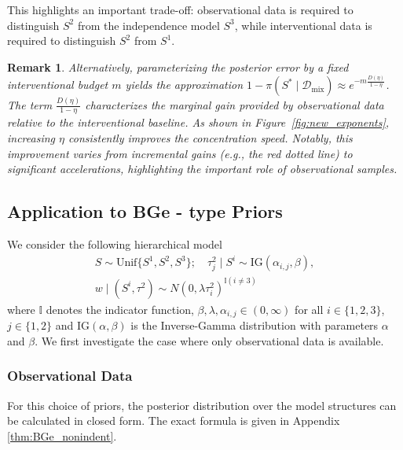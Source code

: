 \documentclass[accepted]{uai2026} %
\newcommand{\train}{\mathcal{D}}
\newcommand{\mixdata}{\train_{\text{mix}}}
\theoremstyle{boldremark}
\newtheorem{remark}{Remark}
\begin{document}
This highlights an important trade-off: observational data is required to distinguish $S^2$ from the independence model $S^3$, while interventional data is required to distinguish $S^2$ from $S^1$. %
\begin{remark}
    Alternatively, parameterizing the posterior error by a fixed interventional budget $m$ yields the approximation $1 - \pi(S^* \mid \mixdata) \approx e^{-m \frac{D(\eta)}{1-\eta}}$. The term $\frac{D(\eta)}{1-\eta}$ characterizes the marginal gain provided by observational data relative to the interventional baseline. As shown in Figure~\ref{fig:new_exponents}, increasing $\eta$ consistently improves the concentration speed. Notably, this improvement varies from incremental gains (e.g., the red dotted line) to significant accelerations, highlighting the important role of observational samples.
\end{remark}


\subsection{Application to BGe - type  Priors}
\label{subsec:bge_models}
We consider the following hierarchical model
\begin{equation}
\label{eq:BGe_priors_compact}
\begin{split}
    S \sim \text{Unif}\{S^1, S^2, S^3\}; \quad \tau_j^2 \mid S^i \sim \text{IG}(\alpha_{i,j}, \beta), \\
    w \mid (S^i, \tau^2) \sim N(0, \lambda\tau_i^2)^{\mathbb{I}(i \neq 3)}
\end{split}
\end{equation}
where $\mathbb{I}$ denotes the indicator function, $\beta, \lambda, \alpha_{i,j} \in (0, \infty)$ for all $i \in \{1, 2, 3\}$, $j \in \{1,2\}$ and $\text{IG}(\alpha, \beta)$ is the Inverse-Gamma distribution with parameters $\alpha$ and $\beta$. We first investigate the case where only observational data is available.

\subsubsection{Observational Data}
For this choice of priors, the posterior distribution over the model structures can be calculated in closed form. The exact formula is given in Appendix \ref{thm:BGe_nonindent}.
\end{document}
